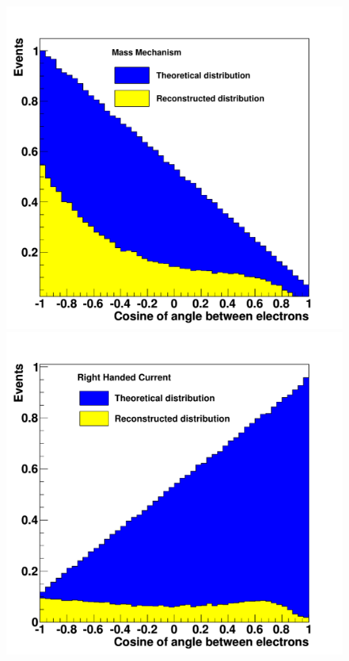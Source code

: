 \documentclass[main.tex]{subfiles}
\begin{document}
\begin{figure}[h!]
\begin{center}
\includegraphics[scale=0.27]{pictures/Chap2/Fig4a.pdf}
\includegraphics[scale=0.27]{pictures/Chap2/Fig4b.pdf}

\end{center}
\end{figure}
\end{document}
